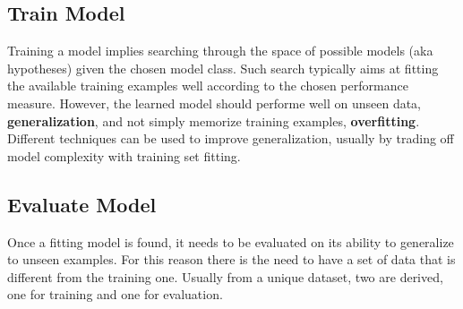 \subsection{Train Model}
Training a model implies searching through the space of possible models (aka hypotheses) given the chosen model class.\newline
Such search typically aims at fitting the available training examples well according to the chosen performance measure. \newline
However, the learned model should performe well on unseen data, \textbf{generalization}, and not simply memorize training examples, \textbf{overfitting}.\newline
Different techniques can be used to improve generalization, usually by trading off model complexity with training set fitting.
%
%
\subsection{Evaluate Model}
Once a fitting model is found, it needs to be evaluated on its ability to generalize to unseen examples. \newline
For this reason there is the need to have a set of data that is different from the training one. Usually from a unique dataset, two are derived, one for training and one for evaluation.


